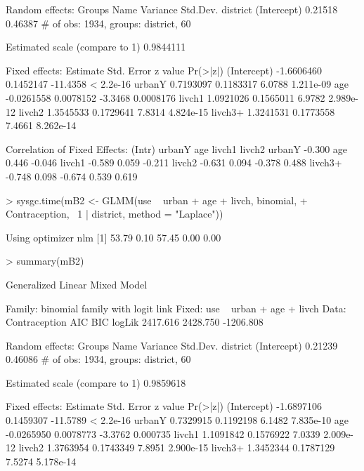 \documentclass[12pt]{article}
\begin{document}
\begin{Schunk}
\begin{Soutput}
Random effects:
     Groups        Name    Variance    Std.Dev. 
   district (Intercept)     0.21518     0.46387 
# of obs: 1934, groups: district, 60

Estimated scale (compare to 1)  0.9844111 

Fixed effects:
              Estimate Std. Error  z value  Pr(>|z|)
(Intercept) -1.6606460  0.1452147 -11.4358 < 2.2e-16
urbanY       0.7193097  0.1183317   6.0788 1.211e-09
age         -0.0261558  0.0078152  -3.3468 0.0008176
livch1       1.0921026  0.1565011   6.9782 2.989e-12
livch2       1.3545533  0.1729641   7.8314 4.824e-15
livch3+      1.3241531  0.1773558   7.4661 8.262e-14

Correlation of Fixed Effects:
        (Intr) urbanY age    livch1 livch2
urbanY  -0.300                            
age      0.446 -0.046                     
livch1  -0.589  0.059 -0.211              
livch2  -0.631  0.094 -0.378  0.488       
livch3+ -0.748  0.098 -0.674  0.539  0.619
\end{Soutput}
\begin{Sinput}
> sysgc.time(mB2 <- GLMM(use ~ urban + age + livch, binomial, 
+     Contraception, ~1 | district, method = "Laplace"))
\end{Sinput}
\begin{Soutput}
Using optimizer nlm 
[1] 53.79  0.10 57.45  0.00  0.00
\end{Soutput}
\begin{Sinput}
> summary(mB2)
\end{Sinput}
\begin{Soutput}
Generalized Linear Mixed Model

Family: binomial family with logit link
Fixed: use ~ urban + age + livch 
Data: Contraception 
      AIC      BIC    logLik
 2417.616 2428.750 -1206.808

Random effects:
     Groups        Name    Variance    Std.Dev. 
   district (Intercept)     0.21239     0.46086 
# of obs: 1934, groups: district, 60

Estimated scale (compare to 1)  0.9859618 

Fixed effects:
              Estimate Std. Error  z value  Pr(>|z|)
(Intercept) -1.6897106  0.1459307 -11.5789 < 2.2e-16
urbanY       0.7329915  0.1192198   6.1482 7.835e-10
age         -0.0265950  0.0078773  -3.3762  0.000735
livch1       1.1091842  0.1576922   7.0339 2.009e-12
livch2       1.3763954  0.1743349   7.8951 2.900e-15
livch3+      1.3452344  0.1787129   7.5274 5.178e-14


\end{Soutput}
\end{Schunk}
\end{document}
